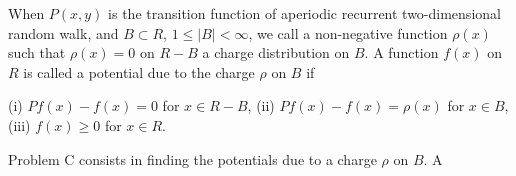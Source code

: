 When $P(x,y)$ is the transition function of aperiodic recurrent two-dimensional random walk, and $B \subset R$, $1 \leq |B| < \infty$, we call a non-negative function $\rho(x)$ such that $\rho(x) = 0$ on $R - B$ a charge distribution on $B$. A function $f(x)$ on $R$ is called a potential due to the charge $\rho$ on $B$ if

(i) $Pf(x) - f(x) = 0$ for $x \in R - B$,
(ii) $Pf(x) - f(x) = \rho(x)$ for $x \in B$,
(iii) $f(x) \geq 0$ for $x \in R$.

Problem C consists in finding the potentials due to a charge $\rho$ on $B$. A